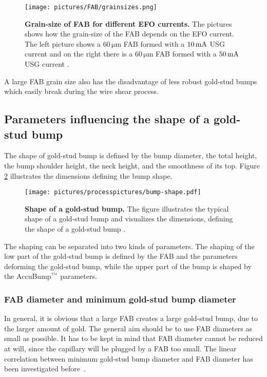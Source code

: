 \begin{figure}
\begin{center}
\texttt{[image: pictures/FAB/grainsizes.png]}
\end{center}
\caption[Grain-size of Free Air Ball for different EFO currents]{\textbf{Grain-size of \acl{FAB} for different \ac{EFO} currents.} The pictures shows how the grain-size of the \ac{FAB} depends on the \ac{EFO} current. The left picture shows a $60\,\si{\micro \meter}$ \ac{FAB} formed with a $10\,\rm{mA}$ \ac{USG} current and on the right there is a $60\,\si{\micro \meter}$ \ac{FAB} formed with a $50\,\rm{mA}$ \ac{USG} current \cite{Jun14}.}\label{pic:FAB_grainsize}
\end{figure}

A large \ac{FAB} grain size also has the disadvantage of less robust gold-stud bumps which easily break during the wire shear process.

\subsection{Parameters influencing the shape of a gold-stud bump}
The shape of gold-stud bump is defined by the bump diameter, the total height, the bump shoulder height, the neck height, and the smoothness of its top. Figure \ref{fig:bump-shape} illustrates the dimensions defining the bump shape.
\begin{figure}
\begin{center}
\texttt{[image: pictures/processpictures/bump-shape.pdf]}
\end{center}
\caption[Shape of a gold-stud bump]{\textbf{Shape of a gold-stud bump.} The figure illustrates the typical shape of a gold-stud bump and visualizes the dimensions, defining the shape of a gold-stud bump \cite{Jun14}.}\label{fig:bump-shape}
\end{figure}
The shaping can be separated into two kinds of parameters. The shaping of the low part of the gold-stud bump is defined by the \ac{FAB} and the parameters deforming the gold-stud bump, while the upper part of the bump is shaped by the AccuBump$\rm{\symbTM}$ parameters.

\subsubsection{\ac{FAB} diameter and minimum gold-stud bump diameter}
In general, it is obvious that a large \ac{FAB} creates a large gold-stud bump, due to the larger amount of gold. The general aim should be to use \ac{FAB} diameters as small as possible. It has to be kept in mind that \ac{FAB} diameter cannot be reduced at will, since the capillary will be plugged by a \ac{FAB} too small. The linear correlation between minimum gold-stud bump diameter and \ac{FAB} diameter has been investigated before~\cite{Hei12}.

